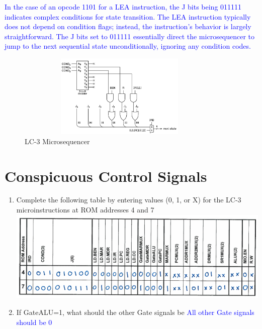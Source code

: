 \documentclass{article}
\begin{document}
\begin{enumerate}[label=(\alph*)]
\begin{enumerate}[label=(\alph*), itemsep = 50pt]
        \newline \newline \textcolor{blue} {In the case of an opcode 1101 for a LEA instruction, the J bits being 011111 indicates complex conditions for state transition. The LEA instruction typically does not depend on condition flags; instead, the instruction’s behavior is largely straightforward. The J bits set to 011111 essentially direct the microsequencer to jump to the next sequential state unconditionally, ignoring any condition codes.}
        \vspace{2cm}
        \begin{figure}[ht]
            \centering
            \includegraphics[width=10cm,height=4cm]{figures/microsequencer.png}
            \caption{LC-3 Microsequencer}
            \label{fig:optionalLabel}
            \end{figure}
        \newpage
    \end{enumerate}

    
    \section{Conspicuous Control Signals}
    \begin{enumerate}[label=(\alph*),itemsep = 10pt]
        \item Complete the following table by entering values (0, 1, or X) for the LC-3 microinstructions at ROM addresses 4 and 7
        \newline 
            \includegraphics[width=1\linewidth]{figures/8a sol.png}
        \item  If GateALU=1, what should the other Gate signals be
        \newline \textcolor{blue}{All other Gate signals should be 0}
    \end{enumerate}


\end{enumerate}
\end{document}
